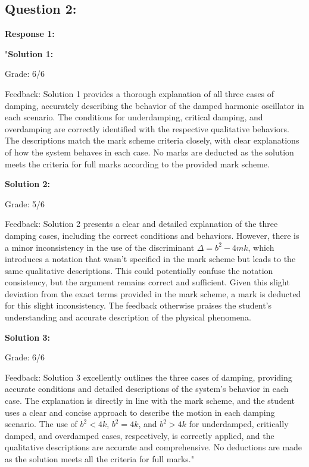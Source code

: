\documentclass[a4paper,11pt]{article}
\begin{document}
\subsection*{Question 2:}

\textbf{Response 1:}

"\textbf{Solution 1:}

Grade: 6/6

Feedback: Solution 1 provides a thorough explanation of all three cases of damping, accurately describing the behavior of the damped harmonic oscillator in each scenario. The conditions for underdamping, critical damping, and overdamping are correctly identified with the respective qualitative behaviors. The descriptions match the mark scheme criteria closely, with clear explanations of how the system behaves in each case. No marks are deducted as the solution meets the criteria for full marks according to the provided mark scheme.

\textbf{Solution 2:}

Grade: 5/6

Feedback: Solution 2 presents a clear and detailed explanation of the three damping cases, including the correct conditions and behaviors. However, there is a minor inconsistency in the use of the discriminant \(\Delta = b^2 - 4mk\), which introduces a notation that wasn't specified in the mark scheme but leads to the same qualitative descriptions. This could potentially confuse the notation consistency, but the argument remains correct and sufficient. Given this slight deviation from the exact terms provided in the mark scheme, a mark is deducted for this slight inconsistency. The feedback otherwise praises the student's understanding and accurate description of the physical phenomena.

\textbf{Solution 3:}

Grade: 6/6

Feedback: Solution 3 excellently outlines the three cases of damping, providing accurate conditions and detailed descriptions of the system's behavior in each case. The explanation is directly in line with the mark scheme, and the student uses a clear and concise approach to describe the motion in each damping scenario. The use of \(b^2 < 4k\), \(b^2 = 4k\), and \(b^2 > 4k\) for underdamped, critically damped, and overdamped cases, respectively, is correctly applied, and the qualitative descriptions are accurate and comprehensive. No deductions are made as the solution meets all the criteria for full marks."
\end{document}
